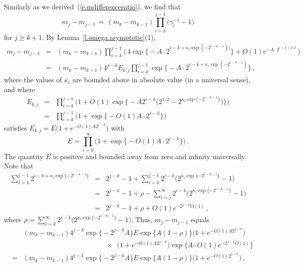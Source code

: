 \documentclass[letterpaper,11pt,oneside,reqno]{amsbook}
\numberwithin{figure}{chapter}
\theoremstyle{definition}
\theoremstyle{definition}
\theoremstyle{definition}
\theoremstyle{definition}
\theoremstyle{definition}
\newcommand{\macgsee}{\gamma}
\begin{document}
Similarly as we derived~(\ref{e.mdifferenceratio}), we find that
$$
 m_j - m_{j-1} \, = \, (m_k - m_{k-1}) \prod_{i = k}^{j-1} \big( \macgsee_i^{-1} - 1 \big) 
$$
for $j \geq k+1$. By Lemma~\ref{l.omega.asymptotic}(1),
\begin{eqnarray*}
 m_j - m_{j-1} & = & (m_k - m_{k-1}) \prod_{i = k}^{j-1} \Big( \, 4 \exp \Big\{ -A \cdot 2^{i -k+ \kappa_i \exp ( -2^{i-k-1} )   \big)} \Big\} + O(1) e^{-A \cdot 2^{i-k + 1/2 }} \, \Big) \\ 
 & = &  (m_k - m_{k-1}) 4^{j-k} E_{k,j} \prod_{i = k}^{j-1}   \exp \Big\{ -A \cdot 2^{i -k+ \kappa_i \exp ( -2^{i-k-1} )}      \Big\} \, , 
  \end{eqnarray*}
where the values of $\kappa_i$ are bounded above in absolute value (in a universal sense), and 
  where 
 \begin{eqnarray*}
  E_{k,j} & = & \prod_{i=k}^{j-1} \Big( 1 + O(1) \exp \big\{ - A 2^{i-k} \big(2^{1/2} - 2^{\kappa_i \exp \{- 2^{i-k-1} \}} \big) \big\} \Big) \\
  & = & \prod_{i=k}^{j-1} \Big( 1 + \exp \big\{ - O(1)A \cdot 2
  ^{i-k} \big\} \Big)
 \end{eqnarray*}
satisfies $E_{k,j} = E \big( 1 + e^{-O(1)A 2^{j-k}}\big)$ with
$$
E = \prod_{i=k}^\infty \Big( 1 + \exp \big\{ - O(1)A \cdot 2
  ^{i-k} \big\} \Big) \, .
$$
The quantity $E$ is positive and bounded away from zero and infinity universally. 
Note that
\begin{eqnarray*}
  \sum_{i= k}^{j-1} 2^{i -k+ \kappa_i \exp \{ - 2^{i-k-1} \} } & = & 2^{j-k} -  1 + \sum_{i= k}^{j-1} 2^{i-k} \big( 2^{\kappa_i \exp \{- 2^{i-k-1} \} }  - 1 \big) \\
  &  = & 2^{j-k} -  1 + \rho - \sum_{i= j}^\infty 2^{i-k} \big( 2^{\kappa_i \exp \{ - 2^{i-k-1} \} }  - 1 \big) \\
  & = & 2^{j-k} -  1 + \rho  + O(1) e^{-2^{j-k}O(1)}   \, ,
\end{eqnarray*}
where $\rho = \sum_{i= k}^\infty 2^{i-k} \big( 2^{\kappa_i \exp \{ - 2^{i-k -1} \} }  - 1 \big)$.
Thus, $m_j - m_{j-1}$ equals
\begin{eqnarray*}
 &  & (m_k - m_{k-1}) 4^{j-k} \exp \big\{ - 2^{j-k}A     \big\}   E 
 \exp \big\{  A (   1 - \rho ) \big\}  \big( 1 + e^{-O(1)A 2^{j-k}}\big) \\
 & & \qquad \qquad \qquad \qquad \qquad \qquad \times \, \, \,  \Big( 1 + e^{-O(1)A 2^{j-k}}\Big)
 \exp \Big\{ A \cdot O(1) e^{-2^{j-k}O(1)}    \Big\} \\
  & = &  (m_k - m_{k-1}) 4^{j-k} \exp \big\{ - 2^{j-k}A     \big\}   E 
 \exp \big\{  A (   1 - \rho ) \big\}  \big( 1 + e^{-O(1) 2^{j-k}}\big) \, ,
\end{eqnarray*}
\end{document}
